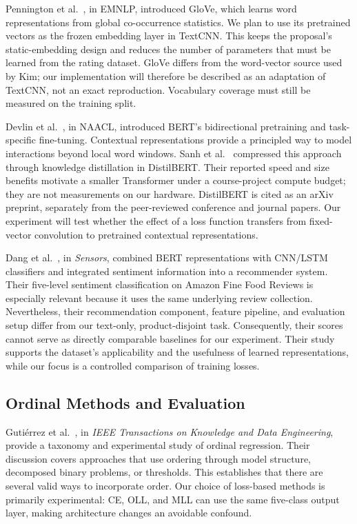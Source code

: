 \documentclass[conference]{IEEEtran}
\begin{document}
Pennington et al.~\cite{glove2014}, in EMNLP, introduced GloVe, which learns word representations from global co-occurrence statistics. We plan to use its pretrained vectors as the frozen embedding layer in TextCNN. This keeps the proposal's static-embedding design and reduces the number of parameters that must be learned from the rating dataset. GloVe differs from the word-vector source used by Kim; our implementation will therefore be described as an adaptation of TextCNN, not an exact reproduction. Vocabulary coverage must still be measured on the training split.

Devlin et al.~\cite{bert2019}, in NAACL, introduced BERT's bidirectional pretraining and task-specific fine-tuning. Contextual representations provide a principled way to model interactions beyond local word windows. Sanh et al.~\cite{distil2019} compressed this approach through knowledge distillation in DistilBERT. Their reported speed and size benefits motivate a smaller Transformer under a course-project compute budget; they are not measurements on our hardware. DistilBERT is cited as an arXiv preprint, separately from the peer-reviewed conference and journal papers. Our experiment will test whether the effect of a loss function transfers from fixed-vector convolution to pretrained contextual representations.

Dang et al.~\cite{dang2021}, in \emph{Sensors}, combined BERT representations with CNN/LSTM classifiers and integrated sentiment information into a recommender system. Their five-level sentiment classification on Amazon Fine Food Reviews is especially relevant because it uses the same underlying review collection. Nevertheless, their recommendation component, feature pipeline, and evaluation setup differ from our text-only, product-disjoint task. Consequently, their scores cannot serve as directly comparable baselines for our experiment. Their study supports the dataset's applicability and the usefulness of learned representations, while our focus is a controlled comparison of training losses.

\subsection{Ordinal Methods and Evaluation}
Guti\'{e}rrez et al.~\cite{survey2016}, in \emph{IEEE Transactions on Knowledge and Data Engineering}, provide a taxonomy and experimental study of ordinal regression. Their discussion covers approaches that use ordering through model structure, decomposed binary problems, or thresholds. This establishes that there are several valid ways to incorporate order. Our choice of loss-based methods is primarily experimental: CE, OLL, and MLL can use the same five-class output layer, making architecture changes an avoidable confound.
\end{document}
